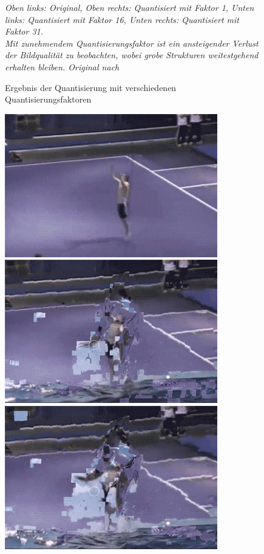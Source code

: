 \begin{figure}[h!]
    \caption{Ergebnis der Quantisierung mit verschiedenen Quantisierungsfaktoren}
    \textit{Oben links: Original, Oben rechts: Quantisiert mit Faktor 1, Unten links: Quantisiert mit Faktor 16, Unten rechts: Quantisiert mit Faktor 31.\\
    Mit zunehmendem Quantisierungsfaktor ist ein ansteigender Verlust der Bildqualität zu beobachten, wobei grobe Strukturen weitestgehend erhalten bleiben. Original nach \cite{brooke_cagle__2016}}
    \label{fig:quantization_multi_mquants}
\end{figure}




\begin{figure}[h!]
    \centering
   \includegraphics[scale=0.5]{images/corruptedGif/frame7.png}
    \includegraphics[scale=0.5]{images/corruptedGif/frame10.png}
    \includegraphics[scale=0.5]{images/corruptedGif/frame13.png}

\end{figure}
